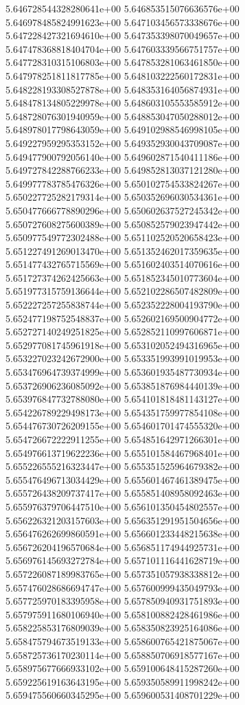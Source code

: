 5.646728544328280641e+00
5.646853515076636576e+00
5.646978485824991623e+00
5.647103456573338676e+00
5.647228427321694610e+00
5.647353398070049657e+00
5.647478368818404704e+00
5.647603339566751757e+00
5.647728310315106803e+00
5.647853281063461850e+00
5.647978251811817785e+00
5.648103222560172831e+00
5.648228193308527878e+00
5.648353164056874931e+00
5.648478134805229978e+00
5.648603105553585912e+00
5.648728076301940959e+00
5.648853047050288012e+00
5.648978017798643059e+00
5.649102988546998105e+00
5.649227959295353152e+00
5.649352930043709087e+00
5.649477900792056140e+00
5.649602871540411186e+00
5.649727842288766233e+00
5.649852813037121280e+00
5.649977783785476326e+00
5.650102754533824267e+00
5.650227725282179314e+00
5.650352696030534361e+00
5.650477666778890296e+00
5.650602637527245342e+00
5.650727608275600389e+00
5.650852579023947442e+00
5.650977549772302488e+00
5.651102520520658423e+00
5.651227491269013470e+00
5.651352462017359635e+00
5.651477432765715569e+00
5.651602403514070616e+00
5.651727374262425663e+00
5.651852345010773604e+00
5.651977315759136644e+00
5.652102286507482809e+00
5.652227257255838744e+00
5.652352228004193790e+00
5.652477198752548837e+00
5.652602169500904772e+00
5.652727140249251825e+00
5.652852110997606871e+00
5.652977081745961918e+00
5.653102052494316965e+00
5.653227023242672900e+00
5.653351993991019953e+00
5.653476964739374999e+00
5.653601935487730934e+00
5.653726906236085092e+00
5.653851876984440139e+00
5.653976847732788080e+00
5.654101818481143127e+00
5.654226789229498173e+00
5.654351759977854108e+00
5.654476730726209155e+00
5.654601701474555320e+00
5.654726672222911255e+00
5.654851642971266301e+00
5.654976613719622236e+00
5.655101584467968401e+00
5.655226555216323447e+00
5.655351525964679382e+00
5.655476496713034429e+00
5.655601467461389475e+00
5.655726438209737417e+00
5.655851408958092463e+00
5.655976379706447510e+00
5.656101350454802557e+00
5.656226321203157603e+00
5.656351291951504656e+00
5.656476262699860591e+00
5.656601233448215638e+00
5.656726204196570684e+00
5.656851174944925731e+00
5.656976145693272784e+00
5.657101116441628719e+00
5.657226087189983765e+00
5.657351057938338812e+00
5.657476028686694747e+00
5.657600999435049793e+00
5.657725970183395958e+00
5.657850940931751893e+00
5.657975911680106940e+00
5.658100882428461986e+00
5.658225853176809039e+00
5.658350823925164086e+00
5.658475794673519133e+00
5.658600765421875067e+00
5.658725736170230114e+00
5.658850706918577167e+00
5.658975677666933102e+00
5.659100648415287260e+00
5.659225619163643195e+00
5.659350589911998242e+00
5.659475560660345295e+00
5.659600531408701229e+00
